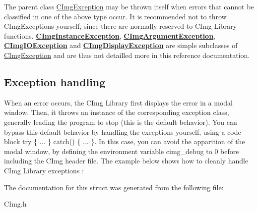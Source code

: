 The parent class \hyperlink{structcimg__library_1_1_c_img_exception}{C\-Img\-Exception} may be thrown itself when errors that cannot be classified in one of the above type occur. It is recommended not to throw C\-Img\-Exceptions yourself, since there are normally reserved to C\-Img Library functions. {\bfseries \hyperlink{structcimg__library_1_1_c_img_instance_exception}{C\-Img\-Instance\-Exception}}, {\bfseries \hyperlink{structcimg__library_1_1_c_img_argument_exception}{C\-Img\-Argument\-Exception}}, {\bfseries \hyperlink{structcimg__library_1_1_c_img_i_o_exception}{C\-Img\-I\-O\-Exception}} and {\bfseries \hyperlink{structcimg__library_1_1_c_img_display_exception}{C\-Img\-Display\-Exception}} are simple subclasses of \hyperlink{structcimg__library_1_1_c_img_exception}{C\-Img\-Exception} and are thus not detailled more in this reference documentation.\hypertarget{structcimg__library_1_1_c_img_exception_ex2}{}\subsection{Exception handling}\label{structcimg__library_1_1_c_img_exception_ex2}
When an error occurs, the C\-Img Library first displays the error in a modal window. Then, it throws an instance of the corresponding exception class, generally leading the program to stop (this is the default behavior). You can bypass this default behavior by handling the exceptions yourself, using a code block {\ttfamily try \{ ... \} catch() \{ ... \}}. In this case, you can avoid the apparition of the modal window, by defining the environment variable {\ttfamily cimg\-\_\-debug} to 0 before including the C\-Img header file. The example below shows how to cleanly handle C\-Img Library exceptions \-: 
 

The documentation for this struct was generated from the following file\-:\begin{DoxyCompactItemize}
\item 
C\-Img.\-h\end{DoxyCompactItemize}

